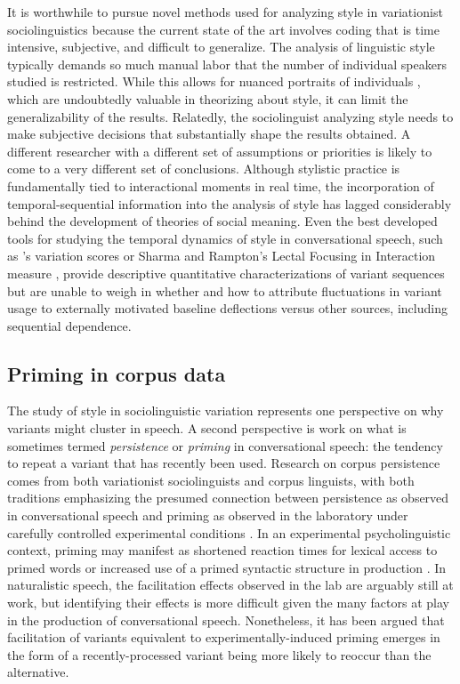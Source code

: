 \documentclass[12pt]{article}
\begin{document}
It is worthwhile to pursue novel methods used for analyzing style in variationist sociolinguistics because the current state of the art involves coding that is time intensive, subjective, and difficult to generalize. The analysis of linguistic style typically demands so much manual labor that the number of individual speakers studied is restricted. While this allows for nuanced portraits of individuals \citep{Podesva:2008,Johnstone:2006}, which are undoubtedly valuable in theorizing about style, it can limit the generalizability of the results. Relatedly, the sociolinguist analyzing style needs to make subjective decisions that substantially shape the results obtained. A different researcher with a different set of assumptions or priorities is likely to come to a very different set of conclusions.
Although stylistic practice is fundamentally tied to interactional moments in real time, the incorporation of temporal-sequential information into the analysis of style has lagged considerably behind the development of theories of social meaning. Even the best developed tools for studying the temporal dynamics of style in conversational speech, such as \citet{Podesva:2008}'s variation scores or Sharma and Rampton's Lectal Focusing in Interaction measure \citeyearpar{Sharma:2011}, provide descriptive quantitative characterizations of variant sequences but are unable to weigh in whether and how to attribute fluctuations in variant usage to externally motivated baseline deflections versus other sources, including sequential dependence.



\subsection{Priming in corpus data}

The study of style in sociolinguistic variation represents one perspective on why variants might cluster in speech. A second perspective is work on what is sometimes termed \emph{persistence} or \emph{priming} in conversational speech: the tendency to repeat a variant that has  recently been used. Research on corpus persistence comes from both  variationist sociolinguists   and  corpus linguists, with both traditions emphasizing the presumed connection between persistence as observed in conversational speech and priming as observed in the laboratory under carefully controlled experimental conditions \citep{Cameron:2004,Gries:2005,Szmrecsanyi:2006,Tamminga:2014b}.
In an experimental psycholinguistic context, priming may manifest as shortened reaction times for lexical access to primed words \citep{Goldinger:1996} or increased use of a primed syntactic structure in production \citep{Pickering:2008}. In naturalistic speech, the facilitation effects observed in the lab are arguably still at work, but identifying their effects is more difficult given the many factors at play in the production of conversational speech. Nonetheless, it has been argued that facilitation of variants equivalent to experimentally-induced priming emerges in the form of a recently-processed variant being more likely to reoccur than the alternative.
\end{document}
